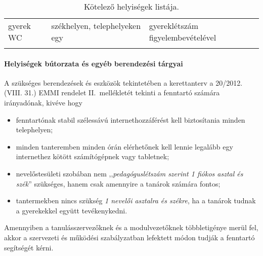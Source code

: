 \begin{longtable}{@{}p{4cm}|p{4cm}|p{6cm}@{}}
    \\ \hline
    gyerek WC                     & székhelyen, telephelyeken egy       &
    gyereklétszám figyelembevételével
    \\

    \caption{Kötelező helyiségek listája.}
    \label{tbl:helyisegek}

\end{longtable}

\vfill\eject

\paragraph{Helyiségek bútorzata és egyéb berendezési tárgyai}

A szükséges berendezések és eszközök tekintetében a kerettanterv a	20/2012. (VIII. 31.) EMMI rendelet II.~mellékletét tekinti a fenntartó számára irányadónak, kivéve hogy
\begin{itemize}
    \item fenntartónak stabil szélessávú internethozzáférést kell biztosítania minden telephelyen;
    \item minden tanteremben minden órán elérhetőnek kell lennie legalább egy internethez kötött számítógépnek vagy tabletnek;
    \item nevelőstesületi szobában nem ,,\emph{pedagóguslétszám szerint 1 fiókos asztal és szék}'' szükséges, hanem csak amennyire a tanárok számára fontos;
    \item tantermekben nincs szükség \emph{1 nevelői asztalra és székre}, ha a tanárok tudnak a gyerekekkel együtt tevékenykedni.
\end{itemize}

Amennyiben a tanulásszervezőknek és a modulvezetőknek többletigénye merül fel, akkor a szervezeti és működési szabályzatban lefektett módon tudják a fenntartó segítségét kérni.